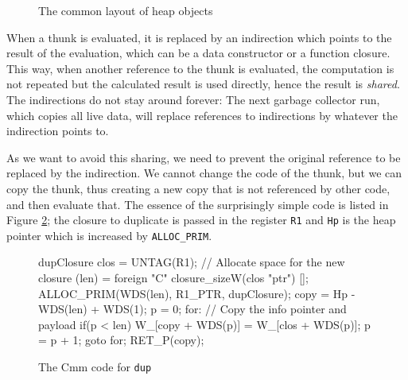 \documentclass[preprint]{sigplanconf}
\theoremstyle{nonumberplain}
\newcommand{\li}{\lstinline[style=Haskell]}
\newcommand{\ci}{\lstinline[style=Cmm]}
\begin{document}
\def\ux{2.2cm}\def\uy{0.6cm}
\begin{figure}
\begin{center}
\end{center}
\caption{The common layout of heap objects}
\label{fig:heap}
\end{figure}

When a thunk is evaluated, it is replaced by an indirection which points to the result of the evaluation, which can be a data constructor or a function closure. This way, when another reference to the thunk is evaluated, the computation is not repeated but the calculated result is used directly, hence the result is \emph{shared}. The indirections do not stay around forever: The next garbage collector run, which copies all live data, will replace references to indirections by whatever the indirection points to.

As we want to avoid this sharing, we need to prevent the original reference to be replaced by the indirection. We cannot change the code of the thunk, but we can copy the thunk, thus creating a new copy that is not referenced by other code, and then evaluate that.
The essence of the surprisingly simple code is listed in Figure \ref{fig:dupcode}; the closure to duplicate is passed in the register \ci-R1- and \ci-Hp- is the heap pointer which is increased by \ci-ALLOC_PRIM-.

\begin{figure}
\begin{cmm}
dupClosure {
    clos = UNTAG(R1);
    // Allocate space for the new closure
    (len) = foreign "C" closure_sizeW(clos "ptr") [];
    ALLOC_PRIM(WDS(len), R1_PTR, dupClosure);
    copy = Hp - WDS(len) + WDS(1);
    p = 0;
    for: // Copy the info pointer and payload
    if(p < len) {
        W_[copy + WDS(p)] = W_[clos + WDS(p)];
        p = p + 1;
        goto for;
    }
    RET_P(copy);
}
\end{cmm}
\caption{The Cmm code for \li-dup-}
\label{fig:dupcode}
\end{figure}
\end{document}
